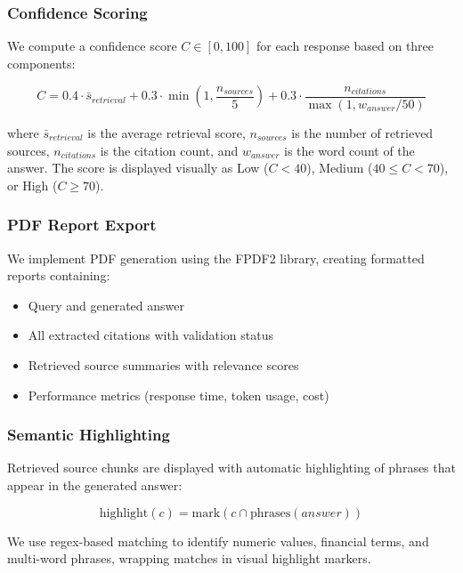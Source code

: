\documentclass[runningheads]{llncs}
\begin{document}
\subsubsection{Confidence Scoring}

We compute a confidence score $C \in [0, 100]$ for each response based on three components:

\begin{equation}
C = 0.4 \cdot \bar{s}_{retrieval} + 0.3 \cdot \min(1, \frac{n_{sources}}{5}) + 0.3 \cdot \frac{n_{citations}}{\max(1, w_{answer}/50)}
\end{equation}

where $\bar{s}_{retrieval}$ is the average retrieval score, $n_{sources}$ is the number of retrieved sources, $n_{citations}$ is the citation count, and $w_{answer}$ is the word count of the answer. The score is displayed visually as Low ($C < 40$), Medium ($40 \leq C < 70$), or High ($C \geq 70$).

\subsubsection{PDF Report Export}

We implement PDF generation using the FPDF2 library, creating formatted reports containing:

\begin{itemize}
    \item Query and generated answer
    \item All extracted citations with validation status
    \item Retrieved source summaries with relevance scores
    \item Performance metrics (response time, token usage, cost)
\end{itemize}

\subsubsection{Semantic Highlighting}

Retrieved source chunks are displayed with automatic highlighting of phrases that appear in the generated answer:

\begin{equation}
\text{highlight}(c) = \text{mark}(c \cap \text{phrases}(answer))
\end{equation}

We use regex-based matching to identify numeric values, financial terms, and multi-word phrases, wrapping matches in visual highlight markers.
\end{document}

